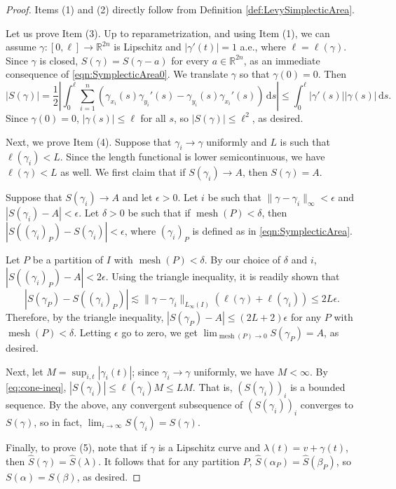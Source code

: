 \documentclass[12pt,reqno]{amsart}
\DeclareMathOperator{\mesh}{mesh}
\newcommand{\ud}[0]{\,\mathrm{d}}
\newcommand{\from}{\colon}
\theoremstyle{remark}
\newcommand{\0}{\mathbf{0}}
\renewcommand{\1}{\mathbf 1}
\begin{document}
\begin{proof}
  Items (1) and (2) directly follow from Definition \ref{def:LevySimplecticArea}.
    
  Let us prove Item (3). Up to reparametrization, and using Item (1), we can assume $\gamma\from [0,\ell]\to \mathbb R^{2n}$ is Lipschitz and $|\gamma'(t)|=1$ a.e., where $\ell=\ell(\gamma)$. Since $\gamma$ is closed, $S(\gamma)=S(\gamma-a)$ for every $a\in\mathbb R^{2n}$, as an immediate consequence of \eqref{eqn:SymplecticArea0}. We translate $\gamma$ so that $\gamma(0) = 0$. Then
  \begin{equation}\label{eq:cone-ineq}
    |S(\gamma)|=\frac{1}{2}\left|\int_0^\ell \sum_{i=1}^n \left(\gamma_{x_i}(s)\gamma_{y_i}'(s) - \gamma_{y_i}(s)\gamma_{x_i}'(s)\right)\ud s\right| \leq \int_0^\ell |\gamma'(s)||\gamma(s)|\ud s.
  \end{equation}
  Since $\gamma(0) = 0$, $|\gamma(s)| \le \ell$ for all $s$, so $|S(\gamma)|\le \ell^2$, as desired.

  Next, we prove Item (4). Suppose that $\gamma_i\to \gamma$ uniformly and $L$ is such that $\ell(\gamma_i) < L$. Since the length functional is lower semicontinuous, we have $\ell(\gamma) < L$ as well. We first claim that if $S(\gamma_i) \to A$, then $S(\gamma) = A$.  

  Suppose that $S(\gamma_i) \to A$ and let $\epsilon > 0$. Let $i$ be such that $\|\gamma - \gamma_i\|_\infty < \epsilon$ and $|S(\gamma_i) - A| < \epsilon$. Let $\delta > 0$ be such that if $\mesh(P)<\delta$, then $|S((\gamma_{i})_P)-S(\gamma_{i})|<\epsilon$, where $(\gamma_i)_P$ is defined as in \eqref{eqn:SymplecticArea}.
  
  Let $P$ be a partition of $I$ with $\mesh(P)<\delta$. By our choice of $\delta$ and $i$, $|S((\gamma_i)_P) - A| < 2\epsilon$. Using the triangle inequality, it is readily shown that 
  \[
    |S(\gamma_P)-S((\gamma_i)_P)|\lesssim \|\gamma-\gamma_i\|_{L_\infty(I)}\left(\ell(\gamma)+\ell(\gamma_i)\right) \le 2L\epsilon.
    \]
  Therefore, by the triangle inequality, $|S(\gamma_P)- A| \le (2L+2)\epsilon$ for any $P$ with $\mesh(P)<\delta$. Letting $\epsilon$ go to zero, we get $\lim_{\mesh(P) \to 0}S(\gamma_P) = A$, as desired.

  Next, let $M = \sup_{i,t} |\gamma_i(t)|$; since $\gamma_i \to \gamma$ uniformly, we have $M < \infty$. By \eqref{eq:cone-ineq}, $|S(\gamma_i)| \le \ell(\gamma_i) M \le LM$. That is, $(S(\gamma_i))_i$ is a bounded sequence. By the above, any convergent subsequence of $(S(\gamma_i))_i$ converges to $S(\gamma)$, so in fact, $\lim_{i\to \infty} S(\gamma_i) = S(\gamma)$.

  Finally, to prove (5), note that if $\gamma$ is a Lipschitz curve and $\lambda(t) = v + \gamma(t)$, then $\hat{S}(\gamma) = \hat{S}(\lambda)$. It follows that for any partition $P$, $\hat{S}(\alpha_P) = \hat{S}(\beta_P)$, so $S(\alpha) = S(\beta)$, as desired.
\end{proof}
\end{document}
